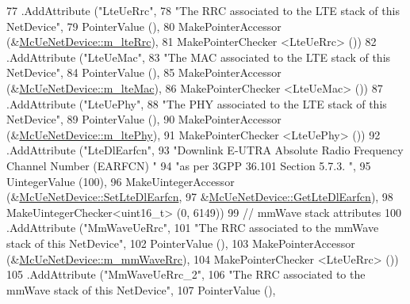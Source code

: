 \begin{DoxyCode}
77     .AddAttribute (\textcolor{stringliteral}{"LteUeRrc"},
78                    \textcolor{stringliteral}{"The RRC associated to the LTE stack of this NetDevice"},
79                    PointerValue (),
80                    MakePointerAccessor (&\hyperlink{classns3_1_1McUeNetDevice_aac81a393e1f9101f016915c957e91d97}{McUeNetDevice::m\_lteRrc}),
81                    MakePointerChecker <LteUeRrc> ())
82     .AddAttribute (\textcolor{stringliteral}{"LteUeMac"},
83                    \textcolor{stringliteral}{"The MAC associated to the LTE stack of this NetDevice"},
84                    PointerValue (),
85                    MakePointerAccessor (&\hyperlink{classns3_1_1McUeNetDevice_ae4f49b8ba86613c84fd16176762c653c}{McUeNetDevice::m\_lteMac}),
86                    MakePointerChecker <LteUeMac> ())
87     .AddAttribute (\textcolor{stringliteral}{"LteUePhy"},
88                    \textcolor{stringliteral}{"The PHY associated to the LTE stack of this NetDevice"},
89                    PointerValue (),
90                    MakePointerAccessor (&\hyperlink{classns3_1_1McUeNetDevice_a740afd04e5cbf2fdde0de8877a463069}{McUeNetDevice::m\_ltePhy}),
91                    MakePointerChecker <LteUePhy> ())
92     .AddAttribute (\textcolor{stringliteral}{"LteDlEarfcn"},
93                    \textcolor{stringliteral}{"Downlink E-UTRA Absolute Radio Frequency Channel Number (EARFCN) "}
94                    \textcolor{stringliteral}{"as per 3GPP 36.101 Section 5.7.3. "},
95                    UintegerValue (100),
96                    MakeUintegerAccessor (&\hyperlink{classns3_1_1McUeNetDevice_a4a1b309a4e088661363d9225a7b10eac}{McUeNetDevice::SetLteDlEarfcn},
97                                          &\hyperlink{classns3_1_1McUeNetDevice_a63379201974f0f34edfeef0a8160e61f}{McUeNetDevice::GetLteDlEarfcn}),
98                    MakeUintegerChecker<uint16\_t> (0, 6149))
99     \textcolor{comment}{// mmWave stack attributes}
100         .AddAttribute (\textcolor{stringliteral}{"MmWaveUeRrc"},
101                    \textcolor{stringliteral}{"The RRC associated to the mmWave stack of this NetDevice"},
102                    PointerValue (),
103                    MakePointerAccessor (&\hyperlink{classns3_1_1McUeNetDevice_aee9cd8974389dbb0260b3c274cd55f82}{McUeNetDevice::m\_mmWaveRrc}),
104                    MakePointerChecker <LteUeRrc> ())
105         .AddAttribute (\textcolor{stringliteral}{"MmWaveUeRrc\_2"},
106                                                       \textcolor{stringliteral}{"The RRC associated to the mmWave stack of this
       NetDevice"},
107                                                       PointerValue (),

\end{DoxyCode}
